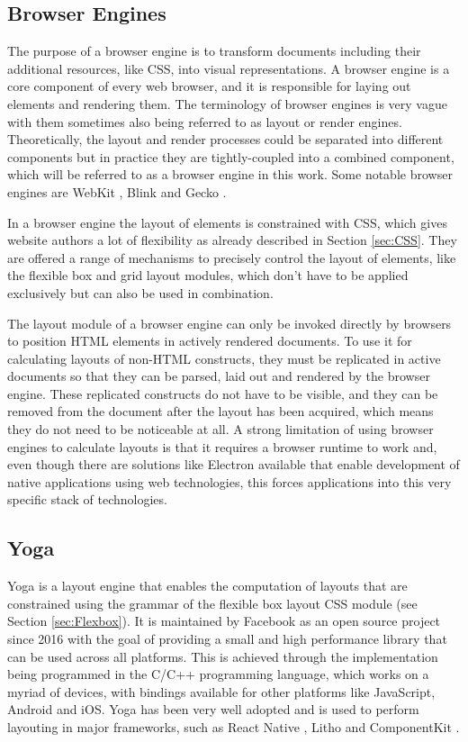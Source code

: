 \subsection{Browser Engines}

The purpose of a browser engine is to transform documents including their additional resources, like CSS, into visual representations. A browser engine is a core component of every web browser, and it is responsible for laying out elements and rendering them. The terminology of browser engines is very vague with them sometimes also being referred to as layout or render engines. Theoretically, the layout and render processes could be separated into different components but in practice they are tightly-coupled into a combined component, which will be referred to as a browser engine in this work. Some notable browser engines are WebKit \parencite{WebKit}, Blink \parencite{Blink} and Gecko \parencite{Gecko}.

In a browser engine the layout of elements is constrained with CSS, which gives website authors a lot of flexibility as already described in Section \ref{sec:CSS}. They are offered a range of mechanisms to precisely control the layout of elements, like the flexible box and grid layout modules, which don't have to be applied exclusively but can also be used in combination. 

The layout module of a browser engine can only be invoked directly by browsers to position HTML elements in actively rendered documents. To use it for calculating layouts of non-HTML constructs, they must be replicated in active documents so that they can be parsed, laid out and rendered by the browser engine. These replicated constructs do not have to be visible, and they can be removed from the document after the layout has been acquired, which means they do not need to be noticeable at all. A strong limitation of using browser engines to calculate layouts is that it requires a browser runtime to work and, even though there are solutions like Electron available that enable development of native applications using web technologies, this forces applications into this very specific stack of technologies. 

\subsection{Yoga}

Yoga \parencite{Yoga} is a layout engine that enables the computation of layouts that are constrained using the grammar of the flexible box layout CSS module (see Section \ref{sec:Flexbox}). It is maintained by Facebook as an open source project since 2016 \parencite{YogaRelease} with the goal of providing a small and high performance library that can be used across all platforms. This is achieved through the implementation being programmed in the C/C++ programming language, which works on a myriad of devices, with bindings available for other platforms like JavaScript, Android and iOS. Yoga has been very well adopted and is used to perform layouting in major frameworks, such as React Native \parencite{ReactNative}, Litho \parencite{Litho} and ComponentKit \parencite{ComponentKit}.

